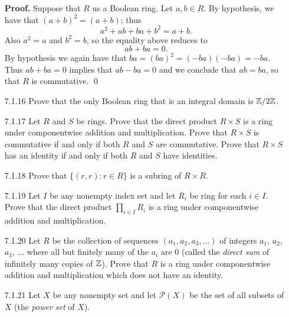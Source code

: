 \begin{enumerate}
      \textbf{Proof.} Suppose that $R$ us a Boolean ring. Let $a, b \in R$. By
      hypothesis, we have that $(a + b)^2 = (a + b)$; thus
      $$a^2 + ab + ba + b^2 = a + b.$$
      Also $a^2 = a$ and $b^2 = b$, so the equality above reduces to
      $$ab + ba = 0.$$
      By hypothesis we again have that $ba = (ba)^2 = (-ba)(-ba) = -ba$. Thus
      $ab + ba = 0$ implies that $ab - ba = 0$ and we conclude that $ab = ba$,
      so that $R$ is commutative. \qed
   \item[7.1.16]  Prove that the only Boolean ring that is an integral domain is
                  $\mathbb{Z}/2\mathbb{Z}$.
   \item[7.1.17]  Let $R$ and $S$ be rings. Prove that the direct product
                  $R \times S$ is a ring under componentwise addition and
                  multiplication. Prove that $R \times S$ is commutative if and
                  only if both $R$ and $S$ are commutative. Prove that
                  $R \times S$ has an identity if and only if both $R$ and $S$
                  have identities.
   \item[7.1.18]  Prove that $\{(r, r) : r \in R\}$ is a subring of
                  $R \times R$.
   \item[7.1.19]  Let $I$ be any nonempty index set and let $R_i$ be ring for
                  each $i \in I$. Prove that the direct product
                  $\prod_{i\in I} R_i$ is a ring under componentwise addition
                  and multiplication.
   \item[7.1.20]  Let $R$ be the collection of sequences
                  $(a_1, a_2, a_3, \ldots)$ of integers $a_1$, $a_2$, $a_3$,  
                  $\ldots$ where all but finitely many of the $a_i$ are 0 (called
                  the \textit{direct sum} of infinitely many copies of $\mathbb{Z}$).
                  Prove that $R$ is a ring under componentwise addition and
                  multiplication which does not have an identity.
   \item[7.1.21]  Let $X$ be any nonempty set and let $\mathcal{P}(X)$ be the
                  set of all subsets of $X$ (the \textit{power set} of $X$).

\end{enumerate}
